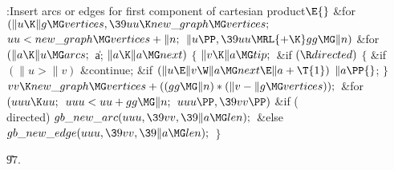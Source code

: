 \B{}:Insert arcs or edges for first component of cartesian product\X${}%
\E{}$\6
\&{for} ${}(\|u\K\|g\MG\\{vertices},\39\\{uu}\K\\{new\_graph}\MG%
\\{vertices};{}$ ${}\\{uu}<\\{new\_graph}\MG\\{vertices}+\|n;{}$ ${}\|u\PP,\39%
\\{uu}\MRL{+{\K}}\\{gg}\MG\|n){}$\1\6
\&{for} ${}(\|a\K\|u\MG\\{arcs};{}$ \|a; ${}\|a\K\|a\MG\\{next}){}$\5
${}\{{}$\1\6
${}\|v\K\|a\MG\\{tip};{}$\6
\&{if} ${}(\R\\{directed}){}$\5
${}\{{}$\1\6
\&{if} ${}(\|u>\|v){}$\1\5
\&{continue};\2\6
\&{if} ${}(\|u\E\|v\W\|a\MG\\{next}\E\|a+\T{1}){}$\1\5
${}\|a\PP{}$;\2\6
\4${}\}{}$\2\6
${}\\{vv}\K\\{new\_graph}\MG\\{vertices}+((\\{gg}\MG\|n)*(\|v-\|g\MG%
\\{vertices}));{}$\6
\&{for} ${}(\\{uuu}\K\\{uu};{}$ ${}\\{uuu}<\\{uu}+\\{gg}\MG\|n;{}$ ${}\\{uuu}%
\PP,\39\\{vv}\PP){}$\1\6
\&{if} (\\{directed})\1\5
${}\\{gb\_new\_arc}(\\{uuu},\39\\{vv},\39\|a\MG\\{len});{}$\2\6
\&{else}\1\5
${}\\{gb\_new\_edge}(\\{uuu},\39\\{vv},\39\|a\MG\\{len});{}$\2\2\6
\4${}\}{}$\2\2\par
\U97.\fi

